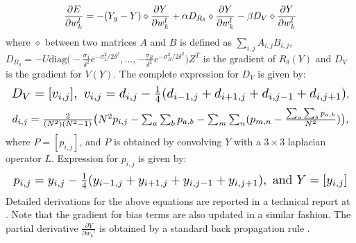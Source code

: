 \documentclass{article}
\def\sqz{\vspace{-3pt}}
\begin{document}
\begin{equation}\label{eqW3}
\frac{\partial E}{\partial w_{k}^{l}} = -(Y_{g} - Y)\diamond\frac{\partial Y}{\partial w_{k}^{l}} + \alpha D_{R_{\delta}}\diamond\frac{\partial Y}{\partial w_{k}^{l}} - \beta D_{V}\diamond\frac{\partial Y}{\partial w_{k}^{l}}\vspace{-2pt}
\end{equation}
where $\diamond$ between two matrices $A$ and $B$ is defined as $\sum_{i,j}A_{i,j}B_{i,j}$, $D_{R_{\delta}} = -U\mbox{diag}\Bigg(-\frac{\sigma_{1}}{\delta^{2}}e^{-\sigma_{1}^{2}/2\delta^{2}},\ldots,-\frac{\sigma_{R}}{\delta^{2}}e^{-\sigma_{R}^{2}/2\delta^{2}}\Bigg)Z^{T}$ is the gradient of $R_{\delta}(Y)$ and $D_{V}$ is the gradient for $V(Y)$. The complete expression for $D_{V}$ is given by:\sqz\sqz
\begin{equation*}\resizebox{\linewidth}{!}{$
D_{V} = [v_{i,j}], \mbox{  }v_{i,j} = d_{i,j} - \frac{1}{4}(d_{i-1,j} + d_{i+1,j} + d_{i, j-1} + d_{i, j+1})$},\sqz
\end{equation*}
\begin{equation*}\resizebox{\linewidth}{!}{$
d_{i,j} = \frac{2}{(N^{2})(N^{2} - 1)}\big(N^{2}p_{i,j} - \sum_{a}\sum_{b}p_{a,b} - \sum_{m}\sum_{n}(p_{m,n} - \frac{\sum_{a}\sum_{b}p_{a,b}}{N^{2}})\big)$},\sqz
\end{equation*}
where $P = [p_{i,j}]$, and $P$ is obtained by convolving $Y$ with a $3\times 3$ laplacian operator $L$. Expression for $p_{i,j}$ is given by:\sqz\sqz
\begin{equation*}\resizebox{\linewidth}{!}{$\label{eqDv3}
p_{i,j} = y_{i,j} - \frac{1}{4}(y_{i-1,j} + y_{i+1,j} + y_{i, j-1} + y_{i, j+1}), \mbox{ and } Y = [y_{i,j}]
$}\sqz\sqz\end{equation*}
Detailed derivations for the above equations are reported in a technical report at \cite{PSU_venkat}. Note that the gradient for bias terms are also updated in a similar fashion. The partial derivative $\frac{\partial Y}{\partial {w_{k}}^{l}}$ is obtained by a standard back propagation rule \cite{lecun1998gradient, werbos1994roots}.
\end{document}
